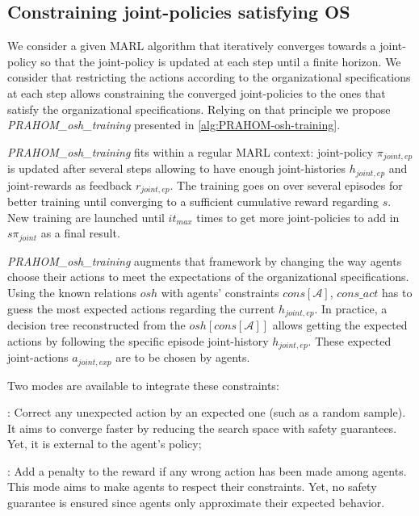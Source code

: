 \documentclass[doubleblind]{ecai}
\newcounter{relation}
\newcounter{proof}
\begin{document}


\subsection{\textbf{Constraining joint-policies satisfying OS}}



We consider a given MARL algorithm that iteratively converges towards a joint-policy so that the joint-policy is updated at each step until a finite horizon.
We consider that restricting the actions according to the organizational specifications at each step allows constraining the converged joint-policies to the ones that satisfy the organizational specifications\footnotemark[1]. Relying on that principle we propose \emph{PRAHOM\_osh\_training} presented in \autoref{alg:PRAHOM-osh-training}.

\emph{PRAHOM\_osh\_training} fits within a regular MARL context: joint-policy $\pi_{joint,ep}$ is updated after several steps allowing to have enough joint-histories $h_{joint,ep}$ and joint-rewards as feedback $r_{joint,ep}$. The training goes on over several episodes for better training until converging to a sufficient cumulative reward regarding $s$. New training are launched until $it_{max}$ times to get more joint-policies to add in $s\pi_{joint}$ as a final result.

\emph{PRAHOM\_osh\_training} augments that framework by changing the way agents choose their actions to meet the expectations of the organizational specifications. Using the known relations $osh$ with agents' constraints $cons[\mathcal{A}]$, $cons\_act$ has to guess the most expected actions regarding the current $h_{joint,ep}$. In practice, a decision tree reconstructed from the $osh[cons[\mathcal{A}]]$ allows getting the expected actions by following the specific episode joint-history $h_{joint,ep}$. These expected joint-actions $a_{joint,exp}$ are to be chosen by agents.

Two modes are available to integrate these constraints:
%
\begin{enumerate*}[label=\roman*),itemjoin={;\quad}]
    \item {}: Correct any unexpected action by an expected one (such as a random sample). It aims to converge faster by reducing the search space with safety guarantees. Yet, it is external to the agent's policy;
    \item {}: Add a penalty to the reward if any wrong action has been made among agents. This mode aims to make agents  to respect their constraints. Yet, no safety guarantee is ensured since agents only approximate their expected behavior.
\end{enumerate*}
\end{document}
